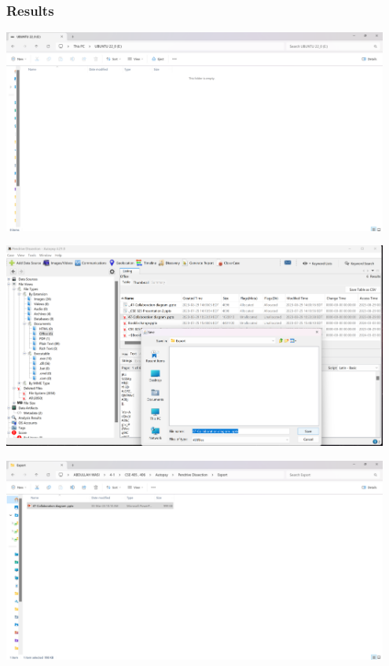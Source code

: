 \documentclass{article}
\begin{document}
\subsubsection*{Results}
\begin{center}
    \includegraphics[width=0.95\textwidth]{4.3/Screenshot (416).png}
\end{center}

\begin{center}
    \includegraphics[width=0.95\textwidth]{4.3/Screenshot (417).png}
\end{center}

\begin{center}
    \includegraphics[width=0.95\textwidth]{4.3/Screenshot (418).png}
\end{center}
\end{document}

